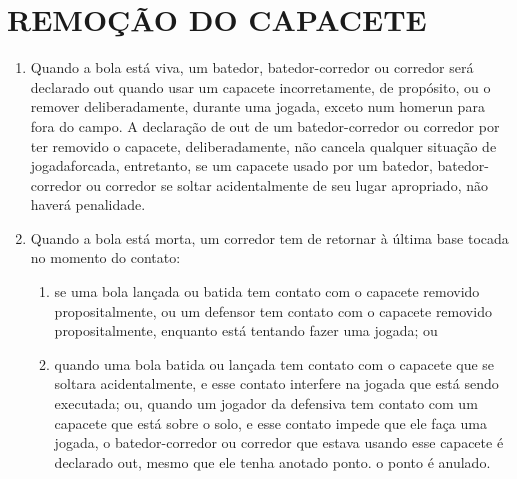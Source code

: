 \section{REMOÇÃO DO CAPACETE}
\begin{enumerate}[label=(\alph*)]
	\item   Quando a bola está viva, um batedor, batedor-corredor ou corredor será declarado \gls{out} quando usar um capacete incorretamente, de propósito, ou o remover deliberadamente, durante uma jogada, exceto num \gls{homerun} para fora do campo. A declaração de \gls{out} de um batedor-corredor ou corredor por ter removido o capacete, deliberadamente, não cancela qualquer situação de  \gls{jogadaforcada}, entretanto, se um capacete usado por um batedor, batedor-corredor ou corredor se soltar acidentalmente de seu lugar apropriado, não haverá penalidade.
\item  Quando a bola está morta, um corredor tem de retornar à última base tocada no momento do contato:

 \begin{enumerate}[label=\roman*.]
 	\item  se uma bola lançada ou batida tem contato com o capacete removido propositalmente, ou um defensor tem contato com o capacete removido propositalmente, enquanto está tentando fazer uma jogada; ou

	\item quando uma bola batida ou lançada tem contato com o capacete que  se soltara acidentalmente, e esse contato interfere na jogada que está sendo executada; ou, quando um jogador da defensiva tem contato com um capacete que está sobre o solo, e esse contato impede que ele faça  uma jogada, o batedor-corredor ou corredor que estava usando esse  capacete é declarado \gls{out}, mesmo que ele tenha anotado ponto. o ponto é anulado.
 \end{enumerate}
\end{enumerate}

